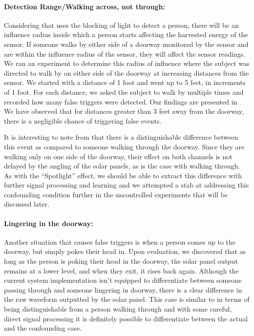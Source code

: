 \paragraph{Detection Range/Walking across, not through:}
\label{subsubsec:range}
Considering that \sysname uses the blocking of light to detect a person, there will be an influence radius inside which a person starts affecting the harvested energy of the sensor.
If someone walks by either side of a doorway monitored by the \sysname sensor and are within the influence radius of the sensor, they will affect the sensor readings.
We ran an experiment to determine this radius of influence where the subject was directed to walk by on either side of the doorway at increasing distances from the sensor.
We started with a distance of 1 foot and went up to 5 feet, in increments of 1 foot.
For each distance, we asked the subject to walk by multiple times and recorded how many false triggers were detected.
Our findings are presented in .
We have observed that for distances greater than 3 feet away from the doorway, there is a negligible chance of triggering false events.

It is interesting to note from  that there is a distinguishable difference between this event as compared to someone walking through the doorway.
Since they are walking only on one side of the doorway, their effect on both channels is not delayed by the angling of the solar panels, as is the case with walking through.
As with the ``Spotlight'' effect, we should be able to extract this difference with further signal processing and learning and we attempted a stab at addressing this confounding condition further in the uncontrolled experiments that will be discussed later.  

\paragraph{Lingering in the doorway:}
Another situation that causes false triggers is when a person comes up to the doorway, but simply pokes their head in.
Upon evaluation, we discovered that as long as the person is poking their head in the doorway, the solar panel output remains at a lower level, and when they exit, it rises back again.
Although the current system implementation isn't equipped to differentiate between someone passing through and someone lingering in doorway, there is a clear difference in the raw waveform outputted by the solar panel.
This case is similar to  in terms of being distinguishable from a person walking through and with some careful, direct signal processing it is definitely possible to differentiate between the actual and the confounding case.

